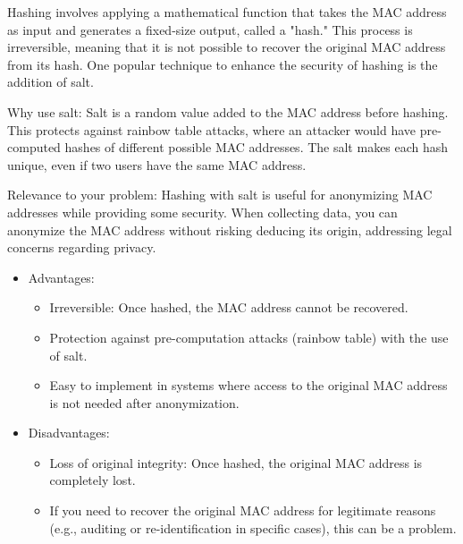 \documentclass{article}
\begin{document}


  Hashing involves applying a mathematical function that takes the MAC address as input 
  and generates a fixed-size output, called a "hash." This process is irreversible,
  meaning that it is not possible to recover the original MAC address from its hash.
  One popular technique to enhance the security of hashing is the addition of salt.

  Why use salt: Salt is a random value added to the MAC address before hashing.
  This protects against rainbow table attacks, where an attacker would have pre-computed
  hashes of different possible MAC addresses. 
  The salt makes each hash unique, even if two users have the same MAC address.

  Relevance to your problem: Hashing with salt is useful for anonymizing MAC addresses
  while providing some security. When collecting data, you can anonymize the MAC address
  without risking deducing its origin, addressing legal concerns regarding privacy.

  \begin{itemize}
    \item Advantages:
      \begin{itemize}
      \item Irreversible: Once hashed, the MAC address cannot be recovered.
      \item Protection against pre-computation attacks (rainbow table) with the use of salt.
      \item Easy to implement in systems where access to the original MAC address is not 
      needed after anonymization.

      \end{itemize}
    \item Disadvantages:
      \begin{itemize}
      \item Loss of original integrity: Once hashed, the original MAC address is completely lost.
      \item If you need to recover the original MAC address for legitimate reasons 
      (e.g., auditing or re-identification in specific cases), this can be a problem.
      \end{itemize}
  \end{itemize}
\end{document}
